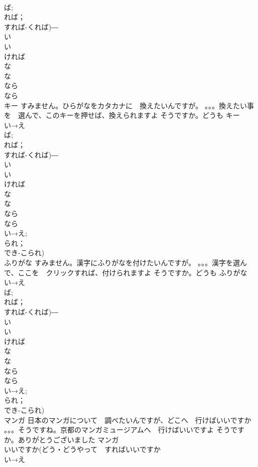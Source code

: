 \documentclass[8pt]{extreport}
\begin{document}
\begin{CJK}{UTF8}{min}
\\	ば;
\\	れば；
\\	すれば-くれば)―　
\\	い
\\	い　
\\	ければ　
\\	な 
\\	な
\\	なら　
\\	なら
\\	キー	すみません。ひらがなをカタカナに　換えたいんですが。 。。。換えたい事を　選んで、このキーを押せば、換えられますよ そうですか。どうも	キー			
\\	い→え
\\	ば;
\\	れば；
\\	すれば-くれば)―　
\\	い
\\	い　
\\	ければ　
\\	な 
\\	な
\\	なら　
\\	なら 
\\	い→え;
\\	られ；
\\	でき-こられ)
\\	ふりがな	すみません。漢字にふりがなを付けたいんですが。 。。。漢字を選んで、ここを　クリックすれば、付けられますよ そうですか。どうも	ふりがな						
\\	い→え
\\	ば;
\\	れば；
\\	すれば-くれば)―　
\\	い
\\	い　
\\	ければ　
\\	な 
\\	な
\\	なら　
\\	なら 
\\	い→え;
\\	られ；
\\	でき-こられ)
\\	マンガ	日本のマンガについて　調べたいんですが、どこへ　行けばいいですか 。。。そうですね。京都のマンガミュージアムへ　行けばいいですよ そうですか。ありがとうございました	マンガ			
\\	いいですか(どう・どうやって　すればいいですか　
\\	い→え

\end{CJK}
\end{document}
